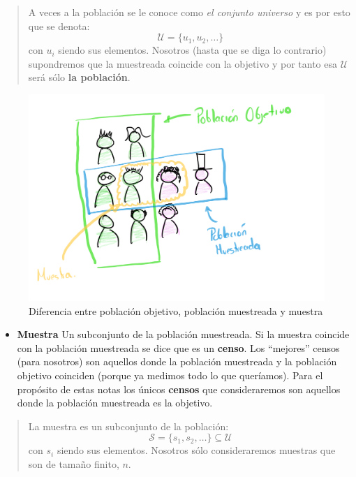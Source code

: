 \documentclass[
]{book}
\providecommand{\tightlist}{%
  \setlength{\itemsep}{0pt}\setlength{\parskip}{0pt}}
\begin{document}
\begin{quote}
A veces a la población se le conoce como \emph{el conjunto universo} y es por esto que se denota:
\[
\mathcal{U} = \{ u_1, u_2, \dots \} 
\]
con \(u_i\) siendo sus elementos. Nosotros (hasta que se diga lo contrario) supondremos que la muestreada coincide con la objetivo y por tanto esa \(\mathcal{U}\) será sólo \textbf{la población}.
\end{quote}

\begin{figure}
\centering
\includegraphics{images/muestra.png}
\caption{Diferencia entre población objetivo, población muestreada y muestra}
\end{figure}

\begin{itemize}
\tightlist
\item
  \textbf{Muestra} Un subconjunto de la población muestreada. Si la muestra coincide con la población muestreada se dice que es un \textbf{censo}. Los ``mejores'' censos (para nosotros) son aquellos donde la población muestreada y la población objetivo coinciden (porque ya medimos todo lo que queríamos). Para el propósito de estas notas los únicos \textbf{censos} que consideraremos son aquellos donde la población muestreada es la objetivo.
\end{itemize}

\begin{quote}
La muestra es un subconjunto de la población:
\[
\mathcal{S} = \{ s_1, s_2, \dots \} \subseteq \mathcal{U}
\]
con \(s_i\) siendo sus elementos. Nosotros sólo consideraremos muestras que son de tamaño finito, \(n\).
\end{quote}
\end{document}
